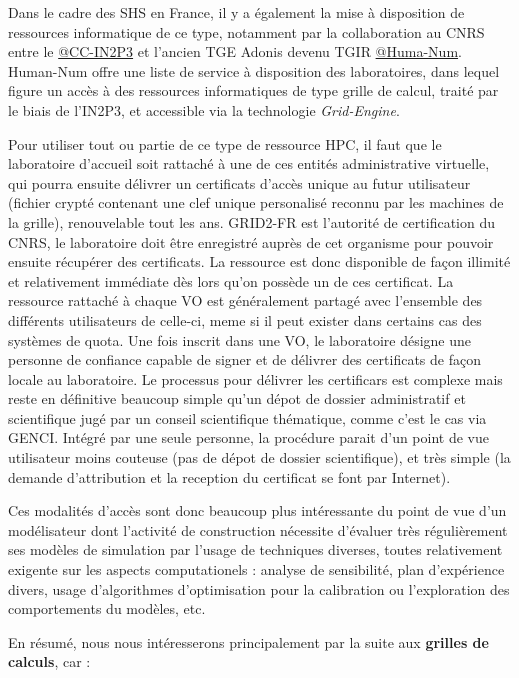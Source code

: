 Dans le cadre des SHS en France, il y a également la mise à disposition de ressources informatique de ce type, notamment par la collaboration au CNRS entre le \href{http://cc.in2p3.fr/}{@CC-IN2P3} et l'ancien TGE Adonis devenu TGIR \href{http://www.huma-num.fr/}{@Huma-Num}. Human-Num offre une liste de service à disposition des laboratoires, dans lequel figure un accès à des ressources informatiques de type grille de calcul, traité par le biais de l'IN2P3, et accessible via la technologie \textit{Grid-Engine}.

Pour utiliser tout ou partie de ce type de ressource HPC, il faut que le laboratoire d'accueil soit rattaché à une de ces entités administrative virtuelle, qui pourra ensuite délivrer un certificats d'accès unique au futur utilisateur (fichier crypté contenant une clef unique personalisé reconnu par les machines de la grille), renouvelable tout les ans. GRID2-FR est l'autorité de certification du CNRS, le laboratoire doit être enregistré auprès de cet organisme pour pouvoir ensuite récupérer des certificats. La ressource est donc disponible de façon illimité et relativement immédiate dès lors qu'on possède un de ces certificat. La ressource rattaché à chaque VO est généralement partagé avec l'ensemble des différents utilisateurs de celle-ci, meme si il peut exister dans certains cas des systèmes de quota. Une fois inscrit dans une VO, le laboratoire désigne une personne de confiance capable de signer et de délivrer des certificats de façon locale au laboratoire. Le processus pour délivrer les certificars est complexe mais reste en définitive beaucoup simple qu'un dépot de dossier administratif et scientifique jugé par un conseil scientifique thématique, comme c'est le cas via GENCI. Intégré par une seule personne, la procédure parait d'un point de vue utilisateur moins couteuse (pas de dépot de dossier scientifique), et très simple (la demande d'attribution et la reception du certificat se font par Internet).

Ces modalités d'accès sont donc beaucoup plus intéressante du point de vue d'un modélisateur dont l'activité de construction nécessite d'évaluer très régulièrement ses modèles de simulation par l'usage de techniques diverses, toutes relativement exigente sur les aspects computationels : analyse de sensibilité, plan d'expérience divers, usage d'algorithmes d'optimisation pour la calibration ou l'exploration des comportements du modèles, etc.


En résumé, nous nous intéresserons principalement par la suite aux \textbf{grilles de calculs}, car :

